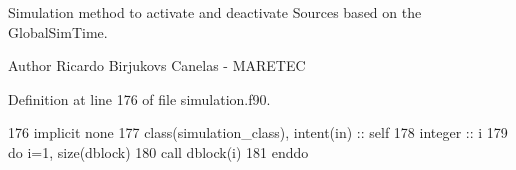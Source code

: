 Simulation method to activate and deactivate Sources based on the GlobalSim\+Time. 

\begin{DoxyAuthor}{Author}
Ricardo Birjukovs Canelas -\/ M\+A\+R\+E\+T\+EC 
\end{DoxyAuthor}


Definition at line 176 of file simulation.\+f90.


\begin{DoxyCode}
176         \textcolor{keywordtype}{implicit none}
177         \textcolor{keywordtype}{class}(simulation\_class), \textcolor{keywordtype}{intent(in)} :: self
178         \textcolor{keywordtype}{integer} :: i
179         \textcolor{keywordflow}{do} i=1, \textcolor{keyword}{size}(dblock)
180             \textcolor{keyword}{call }dblock(i)%
181 \textcolor{keywordflow}{        enddo}        
\end{DoxyCode}
